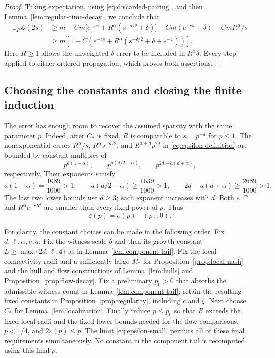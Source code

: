 \begin{proof}
Taking expectation, using \eqref{eq:discarded-pairing}, and then
Lemma~\ref{lem:regular-time-decay}, we conclude that
\begin{align*}
 \mathbb E_P\mathcal L(2s)
 &\ge m
  -C m\bigl[e^{-cs}+R^\alpha(s^{-d/2}+\delta)\bigr]
  -C m(e^{-cs}+\delta)-C mR^\alpha/s\\
 &\ge m\left[1-C\left(e^{-cs}
                   +R^\alpha(s^{-d/2}+\delta+s^{-1})\right)\right].
\end{align*}
Here $R\ge1$ allows the unweighted $\delta$ error to be included
in $R^\alpha\delta$.  Every step applied to either ordered
propagation, which proves both assertions.
\end{proof}

\subsection{Choosing the constants and closing the finite induction}

The error has enough room to recover the assumed sparsity with the
same parameter $p$.  Indeed, after $C_*$ is fixed, $R$ is comparable
to $s=p^{-a}$ for $p\le1$.  The nonexponential errors $R^\alpha/s$,
$R^\alpha s^{-d/2}$, and $R^{\alpha+d}p^{2d}$ in
\eqref{eq:epsilon-definition} are bounded by constant multiples of
\begin{equation}\label{eq:leakage-exponents}
 p^{a(1-\alpha)},\qquad
 p^{a(d/2-\alpha)},\qquad
 p^{2d-a(d+\alpha)},
\end{equation}
respectively.  Their exponents satisfy
\[
 a(1-\alpha)=\frac{1089}{1000}>1,\qquad
 a(d/2-\alpha)\ge\frac{1639}{1000}>1,\qquad
 2d-a(d+\alpha)\ge\frac{2689}{1000}>1.
\]
The last two lower bounds use $d\ge3$; each exponent increases with
$d$.  Both $e^{-cs}$ and $R^\alpha e^{-cR^\xi}$ are smaller than
every fixed power of $p$.  Thus
\begin{equation}\label{eq:epsilon-small}
                         \varepsilon(p)=o(p)\quad(p\downarrow0).
\end{equation}

For clarity, the constant choices can be made in the following order.
Fix $d,\ell,\alpha,\nu,a$.  Fix the witness scale $b$ and then its
growth constant $L\ge\max\{2d,\ell,4\}$ as in
Lemma~\ref{lem:component-tail}.  Fix the local connectivity radii
and a sufficiently large $M_*$ for
Proposition~\ref{prop:local-nash} and the hull and flow constructions
of Lemma~\ref{lem:hulls} and Proposition~\ref{prop:flow-decay}.
Fix a preliminary $p_0>0$ that absorbs the admissible witness count
in Lemma~\ref{lem:component-tail}; retain the resulting fixed
constants in Proposition~\ref{prop:regularity}, including $c$ and
$\xi$.  Next choose $C_*$ for
Lemma~\ref{lem:localization}.  Finally reduce $p\le p_0$ so that
$R$ exceeds the fixed local radii and the fixed lower bounds needed
for the flow comparisons, $p<1/4$, and
$2\varepsilon(p)\le p$.  The limit
\eqref{eq:epsilon-small} permits all of these final requirements
simultaneously.  No constant in the component tail is recomputed
using this final $p$.

